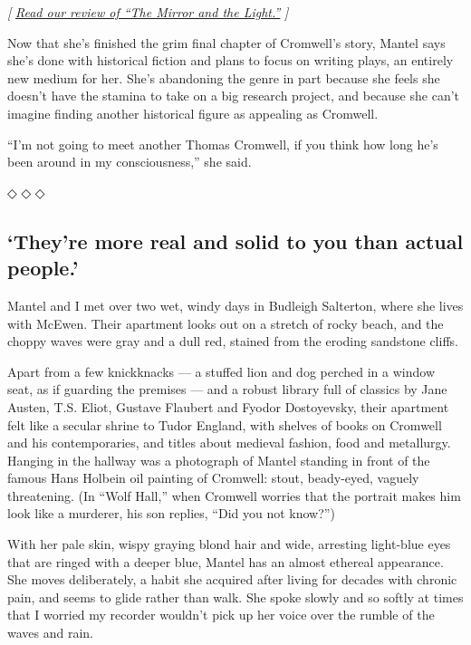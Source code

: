 \emph{{[}}
\href{https://www.nytimes3xbfgragh.onion/2020/03/03/books/review-mirror-light-hilary-mantel.html}{\emph{Read
our review of ``The Mirror and the Light.''}} \emph{{]}}

Now that she's finished the grim final chapter of Cromwell's story,
Mantel says she's done with historical fiction and plans to focus on
writing plays, an entirely new medium for her. She's abandoning the
genre in part because she feels she doesn't have the stamina to take on
a big research project, and because she can't imagine finding another
historical figure as appealing as Cromwell.

``I'm not going to meet another Thomas Cromwell, if you think how long
he's been around in my consciousness,'' she said.

◇ ◇ ◇

\hypertarget{theyre-more-real-and-solid-to-you-than-actual-people}{%
\subsection{`They're more real and solid to you than actual
people.'}\label{theyre-more-real-and-solid-to-you-than-actual-people}}

Mantel and I met over two wet, windy days in Budleigh Salterton, where
she lives with McEwen. Their apartment looks out on a stretch of rocky
beach, and the choppy waves were gray and a dull red, stained from the
eroding sandstone cliffs.

Apart from a few knickknacks --- a stuffed lion and dog perched in a
window seat, as if guarding the premises --- and a robust library full
of classics by Jane Austen, T.S. Eliot, Gustave Flaubert and Fyodor
Dostoyevsky, their apartment felt like a secular shrine to Tudor
England, with shelves of books on Cromwell and his contemporaries, and
titles about medieval fashion, food and metallurgy. Hanging in the
hallway was a photograph of Mantel standing in front of the famous Hans
Holbein oil painting of Cromwell: stout, beady-eyed, vaguely
threatening. (In ``Wolf Hall,'' when Cromwell worries that the portrait
makes him look like a murderer, his son replies, ``Did you not know?'')

With her pale skin, wispy graying blond hair and wide, arresting
light-blue eyes that are ringed with a deeper blue, Mantel has an almost
ethereal appearance. She moves deliberately, a habit she acquired after
living for decades with chronic pain, and seems to glide rather than
walk. She spoke slowly and so softly at times that I worried my recorder
wouldn't pick up her voice over the rumble of the waves and rain.

